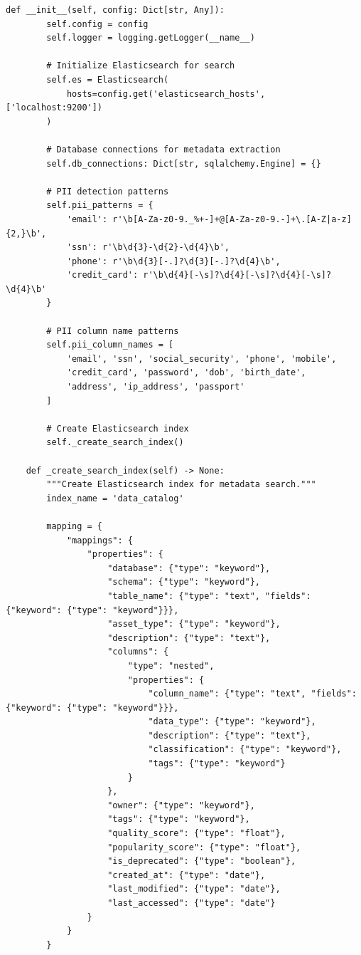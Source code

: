 \begin{lstlisting}[style=python, caption=MetadataCatalog with Automated Metadata Discovery]
    def __init__(self, config: Dict[str, Any]):
        self.config = config
        self.logger = logging.getLogger(__name__)

        # Initialize Elasticsearch for search
        self.es = Elasticsearch(
            hosts=config.get('elasticsearch_hosts', ['localhost:9200'])
        )

        # Database connections for metadata extraction
        self.db_connections: Dict[str, sqlalchemy.Engine] = {}

        # PII detection patterns
        self.pii_patterns = {
            'email': r'\b[A-Za-z0-9._%+-]+@[A-Za-z0-9.-]+\.[A-Z|a-z]{2,}\b',
            'ssn': r'\b\d{3}-\d{2}-\d{4}\b',
            'phone': r'\b\d{3}[-.]?\d{3}[-.]?\d{4}\b',
            'credit_card': r'\b\d{4}[-\s]?\d{4}[-\s]?\d{4}[-\s]?\d{4}\b'
        }

        # PII column name patterns
        self.pii_column_names = [
            'email', 'ssn', 'social_security', 'phone', 'mobile',
            'credit_card', 'password', 'dob', 'birth_date',
            'address', 'ip_address', 'passport'
        ]

        # Create Elasticsearch index
        self._create_search_index()

    def _create_search_index(self) -> None:
        """Create Elasticsearch index for metadata search."""
        index_name = 'data_catalog'

        mapping = {
            "mappings": {
                "properties": {
                    "database": {"type": "keyword"},
                    "schema": {"type": "keyword"},
                    "table_name": {"type": "text", "fields": {"keyword": {"type": "keyword"}}},
                    "asset_type": {"type": "keyword"},
                    "description": {"type": "text"},
                    "columns": {
                        "type": "nested",
                        "properties": {
                            "column_name": {"type": "text", "fields": {"keyword": {"type": "keyword"}}},
                            "data_type": {"type": "keyword"},
                            "description": {"type": "text"},
                            "classification": {"type": "keyword"},
                            "tags": {"type": "keyword"}
                        }
                    },
                    "owner": {"type": "keyword"},
                    "tags": {"type": "keyword"},
                    "quality_score": {"type": "float"},
                    "popularity_score": {"type": "float"},
                    "is_deprecated": {"type": "boolean"},
                    "created_at": {"type": "date"},
                    "last_modified": {"type": "date"},
                    "last_accessed": {"type": "date"}
                }
            }
        }


\end{lstlisting}

